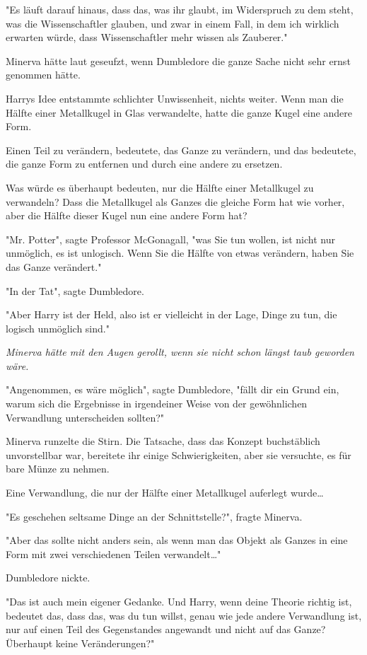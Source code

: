 {"Es läuft darauf hinaus, dass das, was ihr glaubt, im Widerspruch zu dem steht, was die Wissenschaftler glauben, und zwar in einem Fall, in dem ich wirklich erwarten würde, dass Wissenschaftler mehr wissen als Zauberer."

Minerva hätte laut geseufzt, wenn Dumbledore die ganze Sache nicht sehr ernst genommen hätte.

Harrys Idee entstammte schlichter Unwissenheit, nichts weiter. Wenn man die Hälfte einer Metallkugel in Glas verwandelte, hatte die ganze Kugel eine andere Form.

Einen Teil zu verändern, bedeutete, das Ganze zu verändern, und das bedeutete, die ganze Form zu entfernen und durch eine andere zu ersetzen.

Was würde es überhaupt bedeuten, nur die Hälfte einer Metallkugel zu verwandeln? Dass die Metallkugel als Ganzes die gleiche Form hat wie vorher, aber die Hälfte dieser Kugel nun eine andere Form hat?

"Mr. Potter", sagte Professor McGonagall, "was Sie tun wollen, ist nicht nur unmöglich, es ist unlogisch. Wenn Sie die Hälfte von etwas verändern, haben Sie das Ganze verändert."

"In der Tat", sagte Dumbledore.

"Aber Harry ist der Held, also ist er vielleicht in der Lage, Dinge zu tun, die logisch unmöglich sind."

\emph{Minerva hätte mit den Augen gerollt, wenn sie nicht schon längst taub geworden wäre.}

"Angenommen, es wäre möglich", sagte Dumbledore, "fällt dir ein Grund ein, warum sich die Ergebnisse in irgendeiner Weise von der gewöhnlichen Verwandlung unterscheiden sollten?"

Minerva runzelte die Stirn. Die Tatsache, dass das Konzept buchstäblich unvorstellbar war, bereitete ihr einige Schwierigkeiten, aber sie versuchte, es für bare Münze zu nehmen.

Eine Verwandlung, die nur der Hälfte einer Metallkugel auferlegt wurde…

"Es geschehen seltsame Dinge an der Schnittstelle?", fragte Minerva.

"Aber das sollte nicht anders sein, als wenn man das Objekt als Ganzes in eine Form mit zwei verschiedenen Teilen verwandelt…"

Dumbledore nickte.

"Das ist auch mein eigener Gedanke. Und Harry, wenn deine Theorie richtig ist, bedeutet das, dass das, was du tun willst, genau wie jede andere Verwandlung ist, nur auf einen Teil des Gegenstandes angewandt und nicht auf das Ganze? Überhaupt keine Veränderungen?"

}
